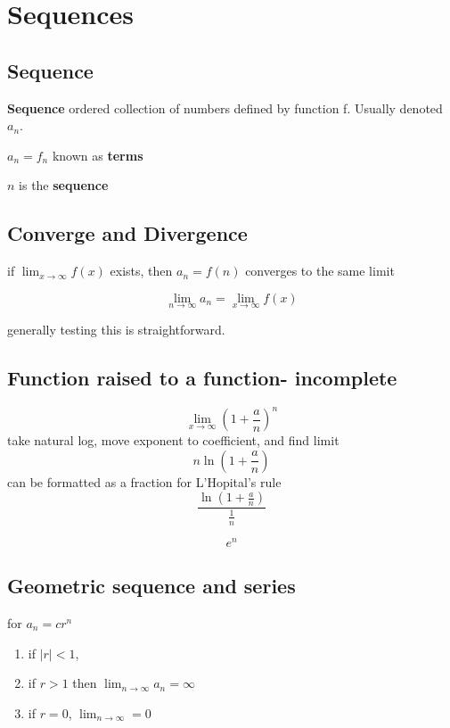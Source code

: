 \section{Sequences}

\subsection{Sequence}
\textbf{Sequence} ordered collection of numbers defined by function f. Usually denoted $a_{n}$.

$a_{n}=f_{n}$ known as \textbf{terms}

$n$ is the \textbf{sequence}

\subsection{Converge and Divergence}
if $\lim_{x\to\infty}f(x)$ exists, then $a_{n}=f(n)$ converges to the same limit

\begin{equation}
	\label{}
\lim_{n\to\infty}a_{n}=\lim_{x\to\infty}f(x)	
\end{equation}

generally testing this is straightforward.

\subsection{Function raised to a function- incomplete}

\begin{equation}
	\label{}
\lim_{x\to\infty}	(1+\frac{a}{n})^{n}	
\end{equation}
take natural log, move exponent to coefficient, and find limit
\begin{equation}
	\label{}
n\ln(1+\frac{a}{n}	)
\end{equation}
can be formatted as a fraction for L'Hopital's rule
\begin{equation}
	\label{}
\frac{\ln(1+\frac{a}{n})}{\frac{1}{n}}	
\end{equation}



\begin{equation}
	\label{}
e^{n}	
\end{equation}


\subsection{Geometric sequence and series }
for $a_{n}=cr^{n}$
\begin{enumerate}
	\item if $|r|<1$,
	\item if $r>1$ then $\lim_{n\to\infty}a_{n}=\infty$
	\item if $r=0$, $\lim_{n\to\infty}=0$
\end{enumerate}

